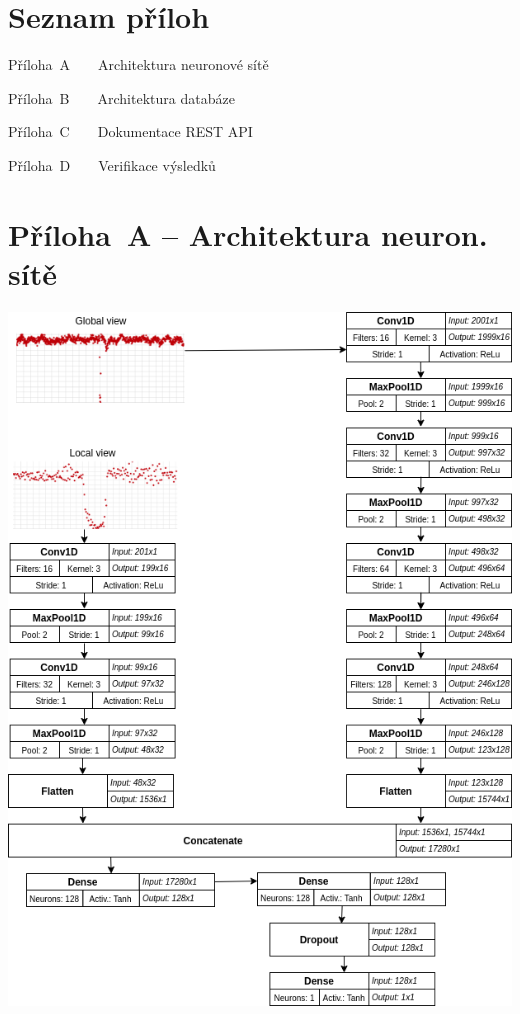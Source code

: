\documentclass[a4paper,12pt]{article}
\begin{document}
{{{{{{{{{{{{{\section*{Seznam příloh}

\noindent Příloha~A~~~~Architektura neuronové sítě \dotfill \pageref{priloha_a}

\noindent Příloha~B~~~~Architektura databáze \dotfill \pageref{priloha_b}

\noindent Příloha~C~~~~Dokumentace REST API \dotfill \pageref{priloha_c}

\noindent Příloha~D~~~~Verifikace výsledků \dotfill \pageref{priloha_d}

\section*{Příloha~A -- Architektura neuron. sítě}\label{priloha_a}
\includegraphics[width=\linewidth]{img/lc_cnn.png}

}}}}}}}}}}}}}
\end{document}
